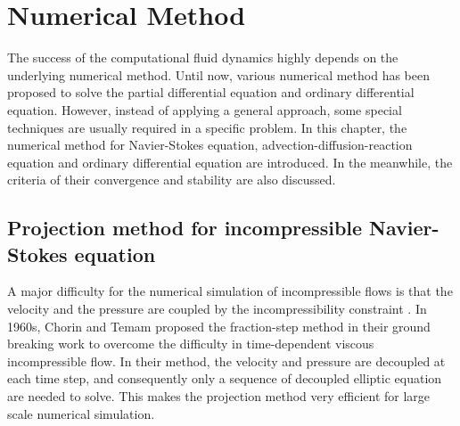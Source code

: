 \chapter{Numerical Method}
The success of the computational fluid dynamics highly depends on the underlying numerical method. Until now, various numerical method has been proposed to solve the partial differential equation and ordinary differential equation. However, instead of applying a general approach, some special techniques are usually required in a specific problem. In this chapter, the numerical method for Navier-Stokes equation, advection-diffusion-reaction equation and ordinary differential equation are introduced. In the meanwhile, the criteria of their convergence and stability are also discussed.

\section{Projection method for incompressible Navier-Stokes equation}
A major difficulty for the numerical simulation of incompressible flows is that the velocity and the pressure are coupled by the incompressibility constraint \cite{Guermond2005Overview}. In 1960s, Chorin and Temam proposed the fraction-step method in their ground breaking work \cite{} to overcome the difficulty in time-dependent viscous incompressible flow. In their method, the velocity and pressure are decoupled at each time step, and consequently only a sequence of decoupled elliptic equation are needed to solve. This makes the projection method very efficient for large scale numerical simulation.

